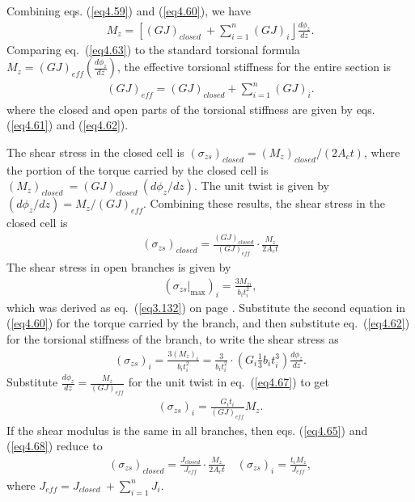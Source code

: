 \documentclass{AeroStructure-ERJohnson}
\begin{document}
\noindent Combining eqs. (\ref{eq4.59}) and (\ref{eq4.60}), we have
\begin{align}\label{eq4.63}
M_{z}=\left[(G J)_{\textit{closed }}+\sum_{i=1}^{n}(G J)_{i}\right\rfloor \frac{d \phi_{z}}{d z}.
\end{align}
Comparing eq.~(\ref{eq4.63}) to the standard torsional formula $M_{z}=(G J)_{\textit{eff}}\left(\frac{d \phi_{z}}{d z}\right)$, the effective torsional stiffness for the entire section is\vspace*{-5pt}
\begin{align}\label{eq4.64}
(G J)_{\textit{eff}}=(G J)_{\textit{closed}}+\sum_{i=1}^{n}(G J)_{i}.
\end{align}
where the closed and open parts of the torsional stiffness are given by eqs. (\ref{eq4.61}) and (\ref{eq4.62}).

\vfill\pagebreak

The shear stress in the closed cell is $\left(\sigma_{z s}\right)_{\textit{closed}}=\left(M_{z}\right)_{\textit{closed}} /\left(2 A_{c} t\right)$, where the portion of the torque carried by the closed cell is $\left(M_{z}\right)_{\textit{closed }}=(G J)_{\textit{closed }}\left(d \phi_{z}/d z\right)$. The unit twist is given by $\left(d \phi_{z}/d z\right)=M_{z} /(G J)_{\textit{eff}}$. Combining these results, the shear stress in the closed cell is
\begin{align}\label{eq4.65}
\left(\sigma_{z s}\right)_{\textit{closed}}=\frac{(G J)_{\textit{closed}}}{(G J)_{\textit{eff}}} \cdot \frac{M_{z}}{2 A_{c} t}\end{align}
The shear stress in open branches is given by
\begin{align}\label{eq4.66}
\left(\left.\sigma_{z s}\right|_{\max }\right)_{i}=\frac{3 M_{z i}}{b_{i} t_{i}^{2}},
\end{align}
which was derived as eq.~(\ref{eq3.132}) on page \pageref{eq3.132}. Substitute the second equation in (\ref{eq4.60}) for the torque carried by the branch, and then substitute eq.~(\ref{eq4.62}) for the torsional stiffness of the branch, to write the shear stress as
\begin{align}\label{eq4.67}
\left(\sigma_{z s}\right)_{i}=\frac{3\left(M_{z}\right)_{i}}{b_{i} t_{i}^{2}}=\frac{3}{b_{i} t_{i}^{2}} \cdot\left(G_{i} \frac{1}{3} b_{i} t_{i}^{3}\right) \frac{d \phi_{z}}{d z}.
\end{align}
Substitute $\frac{d \phi_{z}}{d z}=\frac{M_{z}}{(G J)_{\textit{eff}}}$ for the unit twist in eq.~(\ref{eq4.67}) to get
\begin{align}\label{eq4.68}
\left(\sigma_{z s}\right)_{i}=\frac{G_{i} t_{i}}{(G J)_{\textit{eff}}} M_{z}.
\end{align}
If the shear modulus is the same in all branches, then eqs. (\ref{eq4.65}) and (\ref{eq4.68}) reduce to
\begin{align}\label{eq4.69}
\left(\sigma_{z s}\right)_{\textit{closed}}=\frac{J_{\textit{closed}}}{J_{\textit{eff}}} \cdot \frac{M_{z}}{2 A_{c} t} \quad\left(\sigma_{z s}\right)_{i}=\frac{t_{i} M_{z}}{J_{\textit{eff}}},
\end{align}
where $J_{\textit{eff}}=J_{\textit{closed }}+\displaystyle\sum\limits_{i=1}^{n} J_{i}$.
\end{document}
